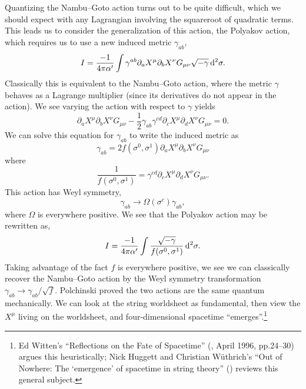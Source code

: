 Quantizing the Nambu--Goto action turns out to be quite difficult, which
we should expect with any Lagrangian involving the squareroot of
quadratic terms. This leads us to consider the generalization of this
action, the Polyakov action, which requires us to use a new induced
metric $\gamma_{ab}$,
\begin{equation}
I=\frac{-1}{4\pi\alpha'}\int\gamma^{ab}\partial_{a}X^{\mu}\partial_{b}X^{\nu}G_{\mu\nu}\sqrt{-\gamma}\,\mathrm{d}^{2}\sigma.
\end{equation}
Classically this is equivalent to the Nambu--Goto action, where the
metric $\gamma$ behaves as a Lagrange multiplier (since its derivatives
do not appear in the action). We see varying the action with respect to
$\gamma$ yields
\begin{equation}
\partial_{a}X^{\mu}\partial_{b}X^{\nu}G_{\mu\nu} - \frac{1}{2}\gamma_{ab}\gamma^{cd}\partial_{c}X^{\mu}\partial_{d}X^{\nu}G_{\mu\nu}=0.
\end{equation}
We can solve this equation for $\gamma_{ab}$ to write the induced metric
as
\begin{equation}
\gamma_{ab}=2f(\sigma^{0},\sigma^{1})\partial_{a}X^{\mu}\partial_{b}X^{\nu}G_{\mu\nu}
\end{equation}
where
\begin{equation}
\frac{1}{f(\sigma^{0},\sigma^{1})} = \gamma^{cd}\partial_{c}X^{\mu}\partial_{d}X^{\nu}G_{\mu\nu}.
\end{equation}
This action has Weyl symmetry,
\begin{equation}
\gamma_{ab}\to \Omega(\sigma^{c})\gamma_{ab},
\end{equation}
where $\Omega$ is everywhere positive. We see that the Polyakov action
may be rewritten as,
\begin{equation}
I=\frac{-1}{4\pi\alpha'}\int\frac{\sqrt{-\gamma}}{f(\sigma^{0},\sigma^{1})}\,\mathrm{d}^{2}\sigma.
\end{equation}
Taking advantage of the fact $f$ is everywhere positive, we see we can
classically recover the Nambu--Goto action by the Weyl symmetry
transformation $\gamma_{ab}\to\gamma_{ab}/\sqrt{f}$. Polchinski proved
the two actions are the same quantum mechanically. %
We can look at the string worldsheet as fundamental, then view the
$X^{\mu}$ living on the worldsheet, and four-dimensional spacetime
``emerges''.\footnote{Ed Witten's ``Reflections on the Fate of
Spacetime'' (, April 1996, pp.24--30) argues this
heuristically; Nick Huggett and Christian W\"{u}thrich's ``Out of
Nowhere: The `emergence' of spacetime in string theory''
() reviews this general subject.}
